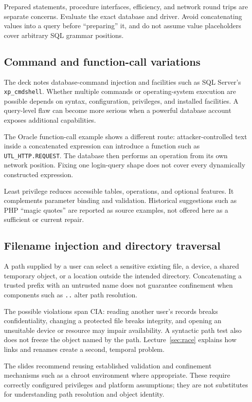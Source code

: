 \documentclass[11pt,a4paper]{article}
\numberwithin{figure}{section}
\begin{document}
Prepared statements, procedure interfaces, efficiency, and network round trips are separate concerns. Evaluate the exact database and driver. Avoid concatenating values into a query before ``preparing'' it, and do not assume value placeholders cover arbitrary SQL grammar positions.

\subsection{Command and function-call variations}
The deck notes database-command injection and facilities such as SQL Server's \texttt{xp\_cmdshell}. Whether multiple commands or operating-system execution are possible depends on syntax, configuration, privileges, and installed facilities. A query-level flaw can become more serious when a powerful database account exposes additional capabilities.

The Oracle function-call example shows a different route: attacker-controlled text inside a concatenated expression can introduce a function such as \texttt{UTL\_HTTP.REQUEST}. The database then performs an operation from its own network position. Fixing one login-query shape does not cover every dynamically constructed expression.

Least privilege reduces accessible tables, operations, and optional features. It complements parameter binding and validation. Historical suggestions such as PHP ``magic quotes'' are reported as source examples, not offered here as a sufficient or current repair.

\subsection{Filename injection and directory traversal}
A path supplied by a user can select a sensitive existing file, a device, a shared temporary object, or a location outside the intended directory. Concatenating a trusted prefix with an untrusted name does not guarantee confinement when components such as \texttt{..} alter path resolution.

The possible violations span CIA: reading another user's records breaks confidentiality, changing a protected file breaks integrity, and opening an unsuitable device or resource may impair availability. A syntactic path test also does not freeze the object named by the path. Lecture~\ref{sec:race} explains how links and renames create a second, temporal problem.

The slides recommend reusing established validation and confinement mechanisms such as a chroot environment where appropriate. These require correctly configured privileges and platform assumptions; they are not substitutes for understanding path resolution and object identity.
\end{document}
